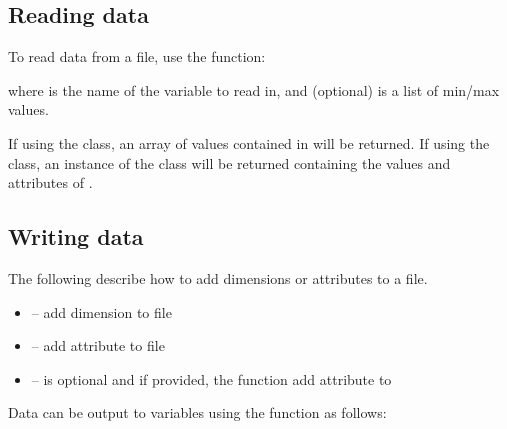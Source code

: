 \documentclass[a4paper,10pt,openany,english]{sphinxmanual}
\begin{document}
\subsection{Reading data}
\label{tutorial:id9}
To read data from a file, use the  function:

\begin{sphinxVerbatim}[commandchars=\\\{\}]
   
\end{sphinxVerbatim}

where  is the name of the variable to read in, and  (optional) is a list of min/max values.

If using the  class, an array of values contained in  will be returned. If using the  class, an instance of the {\hyperref[egadsapi:egads.core.egads_core.EgadsData]{}} class will be returned containing the values and attributes of .


\subsection{Writing data}
\label{tutorial:id10}
The following describe how to add dimensions or attributes to a file.
\begin{itemize}
\item {} 
 -- add dimension to file

\item {} 
 -- add attribute to file

\item {} 
 --  is optional and if provided, the function add attribute to 

\end{itemize}

Data can be output to variables using the  function as follows:

\begin{sphinxVerbatim}[commandchars=\\\{\}]
   
\end{sphinxVerbatim}
\end{document}

